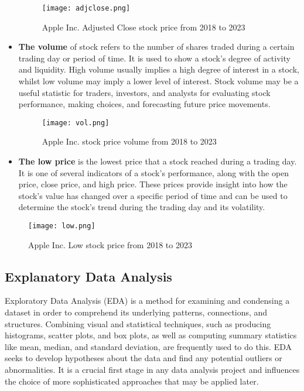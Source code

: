 \documentclass[a4paper]{article}
\begin{document}
\begin{itemize}[leftmargin=7.5pt]
\begin{figure}[!h]
    \centering
    \texttt{[image: adjclose.png]}
    \caption{Apple Inc. Adjusted Close stock price from 2018 to 2023}
    \label{fig:adj}
\end{figure}
    \item \textbf{The volume} of stock refers to the number of shares traded during a certain trading day or period of time. It is used to show a stock's degree of activity and liquidity. High volume usually implies a high degree of interest in a stock, whilst low volume may imply a lower level of interest. Stock volume may be a useful statistic for traders, investors, and analysts for evaluating stock performance, making choices, and forecasting future price movements.
    \begin{figure}[!h]
    \centering
    \texttt{[image: vol.png]}
    \caption{Apple Inc. stock price volume from 2018 to 2023}
    \label{fig:vol}
\end{figure}
\item \textbf{The low price} is the lowest price that a stock reached during a trading day. It is one of several indicators of a stock's performance, along with the open price, close price, and high price. These prices provide insight into how the stock's value has changed over a specific period of time and can be used to determine the stock's trend during the trading day and its volatility.
\end{itemize}

\begin{figure}[!h]
    \centering
    \texttt{[image: low.png]}
    \caption{Apple Inc. Low stock price from 2018 to 2023}
    \label{fig:low}
\end{figure}
\subsection{Explanatory Data Analysis}
Exploratory Data Analysis (EDA) is a method for examining and condensing a dataset in order to comprehend its underlying patterns, connections, and structures. Combining visual and statistical techniques, such as producing histograms, scatter plots, and box plots, as well as computing summary statistics like mean, median, and standard deviation, are frequently used to do this. EDA seeks to develop hypotheses about the data and find any potential outliers or abnormalities. It is a crucial first stage in any data analysis project and influences the choice of more sophisticated approaches that may be applied later.
\end{document}
